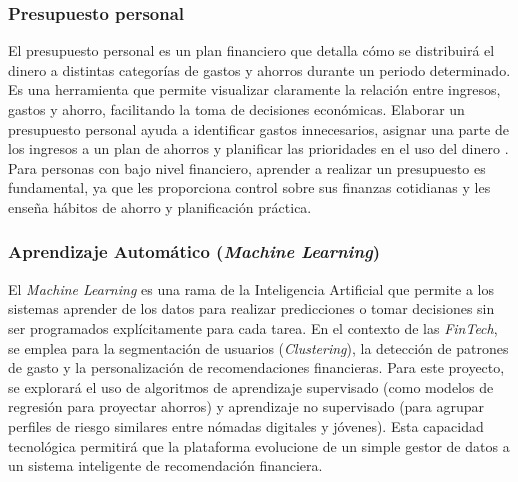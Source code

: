 {}
\subsubsection*{Presupuesto personal}

El presupuesto personal es un plan financiero que detalla cómo se distribuirá el dinero a distintas categorías de gastos y ahorros durante un periodo determinado. Es una herramienta que permite visualizar claramente la relación entre ingresos, gastos y ahorro, facilitando la toma de decisiones económicas. Elaborar un presupuesto personal ayuda a identificar gastos innecesarios, asignar una parte de los ingresos a un plan de ahorros y planificar las prioridades en el uso del dinero \parencite{GrupoR01}. Para personas con bajo nivel financiero, aprender a realizar un presupuesto es fundamental, ya que les proporciona control sobre sus finanzas cotidianas y les enseña hábitos de ahorro y planificación práctica.

{}
\subsubsection*{Aprendizaje Automático (\textit{Machine Learning})}

El \textit{Machine Learning} es una rama de la Inteligencia Artificial que permite a los sistemas aprender de los datos para realizar predicciones o tomar decisiones sin ser programados explícitamente para cada tarea. En el contexto de las \textit{FinTech}, se emplea para la segmentación de usuarios (\textit{Clustering}), la detección de patrones de gasto y la personalización de recomendaciones financieras. Para este proyecto, se explorará el uso de algoritmos de aprendizaje supervisado (como modelos de regresión para proyectar ahorros) y aprendizaje no supervisado (para agrupar perfiles de riesgo similares entre nómadas digitales y jóvenes). Esta capacidad tecnológica permitirá que la plataforma evolucione de un simple gestor de datos a un sistema inteligente de recomendación financiera.